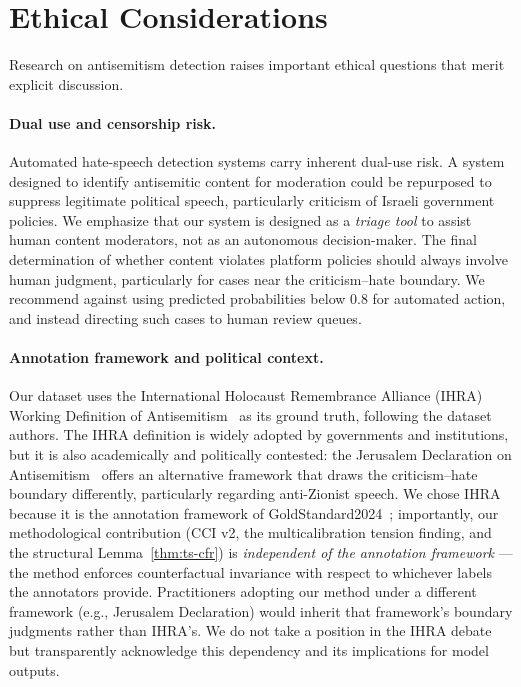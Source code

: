 \section{Ethical Considerations}
\label{sec:ethics}

Research on antisemitism detection raises important ethical questions that merit explicit discussion.

\paragraph{Dual use and censorship risk.}
Automated hate-speech detection systems carry inherent dual-use risk. A system designed to identify antisemitic content for moderation could be repurposed to suppress legitimate political speech, particularly criticism of Israeli government policies. We emphasize that our system is designed as a \emph{triage tool} to assist human content moderators, not as an autonomous decision-maker. The final determination of whether content violates platform policies should always involve human judgment, particularly for cases near the criticism--hate boundary. We recommend against using predicted probabilities below 0.8 for automated action, and instead directing such cases to human review queues.

\paragraph{Annotation framework and political context.}
Our dataset uses the International Holocaust Remembrance Alliance (IHRA) Working Definition of Antisemitism~\citep{ihra2016working} as its ground truth, following the dataset authors. The IHRA definition is widely adopted by governments and institutions, but it is also academically and politically contested: the Jerusalem Declaration on Antisemitism~\citep{jd2021jerusalem} offers an alternative framework that draws the criticism--hate boundary differently, particularly regarding anti-Zionist speech. We chose IHRA because it is the annotation framework of GoldStandard2024~\citep{jikeli2024goldstandard}; importantly, our methodological contribution (CCI v2, the multicalibration tension finding, and the structural Lemma~\ref{thm:ts-cfr}) is \emph{independent of the annotation framework} --- the method enforces counterfactual invariance with respect to whichever labels the annotators provide. Practitioners adopting our method under a different framework (e.g., Jerusalem Declaration) would inherit that framework's boundary judgments rather than IHRA's. We do not take a position in the IHRA debate but transparently acknowledge this dependency and its implications for model outputs.

